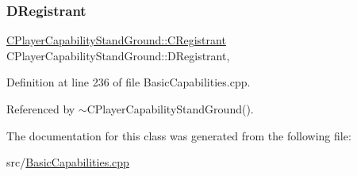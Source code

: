 \subsubsection{\texorpdfstring{D\+Registrant}{DRegistrant}}
{\footnotesize\ttfamily \hyperlink{classCPlayerCapabilityStandGround_1_1CRegistrant}{C\+Player\+Capability\+Stand\+Ground\+::\+C\+Registrant} C\+Player\+Capability\+Stand\+Ground\+::\+D\+Registrant\hspace{0.3cm}{\ttfamily [static]}, {\ttfamily [protected]}}



Definition at line 236 of file Basic\+Capabilities.\+cpp.



Referenced by $\sim$\+C\+Player\+Capability\+Stand\+Ground().



The documentation for this class was generated from the following file\+:\begin{DoxyCompactItemize}
\item 
src/\hyperlink{BasicCapabilities_8cpp}{Basic\+Capabilities.\+cpp}\end{DoxyCompactItemize}
